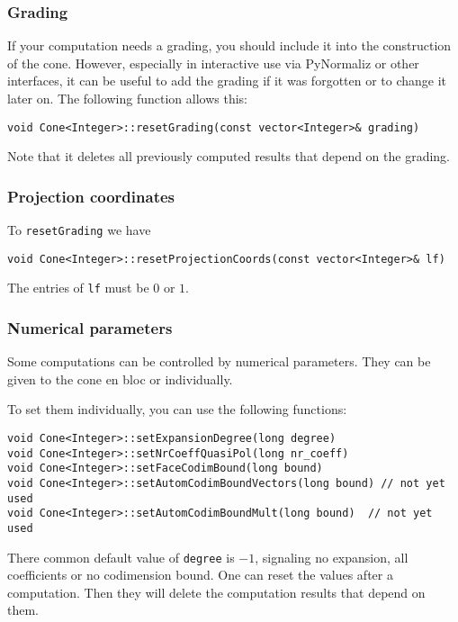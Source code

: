 \documentclass[12pt,a4paper]{scrartcl}
\theoremstyle{definition}
\begin{document}
\begin{small}
\subsubsection{Grading}

If your computation needs a grading, you should include it into the construction of the cone. However, especially in interactive use via PyNormaliz or other interfaces, it can be useful to add the grading if it was forgotten or to change it later on. The following function allows this:

\begin{Verbatim}
void Cone<Integer>::resetGrading(const vector<Integer>& grading)
\end{Verbatim}

Note that it deletes all previously computed results that depend on the grading.

\subsubsection{Projection coordinates}

To \verb|resetGrading| we have
\begin{Verbatim}
void Cone<Integer>::resetProjectionCoords(const vector<Integer>& lf)
\end{Verbatim}
The entries of \verb|lf| must be $0$ or $1$.

\subsubsection{Numerical parameters}

Some computations can be controlled by numerical parameters. They can be given to the cone en bloc or individually.

To set them individually, you can use the following functions:
\begin{Verbatim}
void Cone<Integer>::setExpansionDegree(long degree)
void Cone<Integer>::setNrCoeffQuasiPol(long nr_coeff)
void Cone<Integer>::setFaceCodimBound(long bound)
void Cone<Integer>::setAutomCodimBoundVectors(long bound) // not yet used
void Cone<Integer>::setAutomCodimBoundMult(long bound)  // not yet used
\end{Verbatim}
There common default value of \verb|degree| is $-1$, signaling no expansion, all coefficients or no codimension bound. One can reset the values after a computation. Then they will delete the computation results that depend on them.


\end{small}
\end{document}
